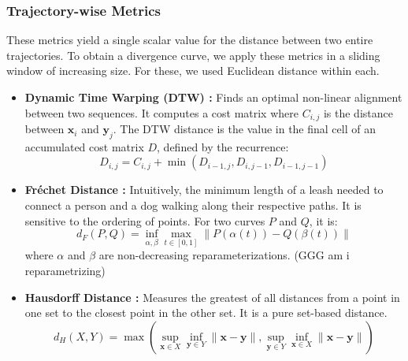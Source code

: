 \documentclass[a4paper,12pt]{article}
\begin{document}
\subsubsection{Trajectory-wise Metrics}
These metrics yield a single scalar value for the distance between two entire trajectories. To obtain a divergence curve, we apply these metrics in a sliding window of increasing size. For these, we used Euclidean distance within each.
\begin{itemize}
    \item \textbf{Dynamic Time Warping (DTW) \cite{SalvadorChan2007}:} Finds an optimal non-linear alignment between two sequences. It computes a cost matrix where $C_{i,j}$ is the distance between $\mathbf{x}_i$ and $\mathbf{y}_j$. The DTW distance is the value in the final cell of an accumulated cost matrix $D$, defined by the recurrence:
    \begin{equation}
        D_{i,j} = C_{i,j} + \min(D_{i-1, j}, D_{i, j-1}, D_{i-1, j-1})
    \end{equation}
    \item \textbf{Fréchet Distance \cite{Denaxas2023} \cite{EiterMannila1994}:} Intuitively, the minimum length of a leash needed to connect a person and a dog walking along their respective paths. It is sensitive to the ordering of points. For two curves $P$ and $Q$, it is:
    \begin{equation}
        d_F(P, Q) = \inf_{\alpha, \beta} \max_{t \in [0,1]} \| P(\alpha(t)) - Q(\beta(t)) \|
    \end{equation}
    where $\alpha$ and $\beta$ are non-decreasing reparameterizations. (GGG am i reparametrizing)
    \item \textbf{Hausdorff Distance \cite{SciPyDirectedHausdorff}:} Measures the greatest of all distances from a point in one set to the closest point in the other set. It is a pure set-based distance.
    \begin{equation}
        d_H(X, Y) = \max \left( \sup_{\mathbf{x} \in X} \inf_{\mathbf{y} \in Y} \|\mathbf{x}-\mathbf{y}\|, \sup_{\mathbf{y} \in Y} \inf_{\mathbf{x} \in X} \|\mathbf{x}-\mathbf{y}\| \right)
    \end{equation}
\end{itemize}
\end{document}
